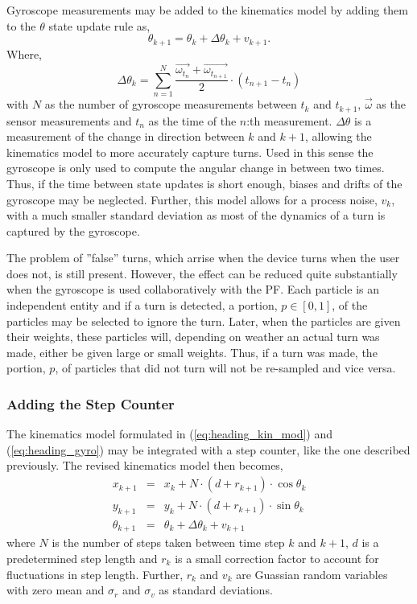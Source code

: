 \documentclass{LTHthesis}
\begin{document}
Gyroscope measurements may be added to the kinematics model by adding them to the $\theta$ state update rule as,
%
\begin{equation}
\theta_{k+1} = \theta_k + \Delta\theta_k + v_{k+1}.\label{eq:heading_gyro}
\end{equation} 
%
Where,
%
\begin{equation}
\Delta\theta_k = \sum^N_{n=1}\frac{\vec{\omega_{t_n}}+\vec{\omega_{t_{n+1}}}}{2}\cdot\left(t_{n+1}-t_n\right)
\end{equation}
%
with $N$ as the number of gyroscope measurements between $t_k$ and $t_{k+1}$, $\vec{\omega}$ as the sensor measurements and $t_n$ as the time of the $n$:th measurement. $\Delta\theta$ is a measurement of the change in direction between $k$ and $k+1$, allowing the kinematics model to more accurately capture turns. Used in this sense the gyroscope is only used to compute the angular change in between two times. Thus, if the time between state updates is short enough, biases and drifts of the gyroscope may be neglected. Further, this model allows for a process noise, $v_k$, with a much smaller standard deviation as most of the dynamics of a turn is captured by the gyroscope. 

The problem of ''false'' turns, which arrise when the device turns when the user does not, is still present. However, the effect can be reduced quite substantially when the gyroscope is used collaboratively with the PF. Each particle is an independent entity and if a turn is detected, a portion, $p\in[0,1]$, of the particles may be selected to ignore the turn. Later, when the particles are given their weights, these particles will, depending on weather an actual turn was made, either be given large or small weights. Thus, if a turn was made, the portion, $p$, of particles that did not turn will not be re-sampled and vice versa. 

\subsubsection{Adding the Step Counter}
%
The kinematics model formulated in (\ref{eq:heading_kin_mod}) and (\ref{eq:heading_gyro}) may be integrated with a step counter, like the one described previously. The revised kinematics model then becomes,
%
\begin{eqnarray}
x_{k+1} &  = & x_k + N\cdot (d + r_{k+1})\cdot\cos{\theta_k} \nonumber\\
y_{k+1} & = &y_k + N\cdot (d + r_{k+1})\cdot\sin{\theta_k}\label{eq:heading_step_kin_mod}\\
\theta_{k+1} & = & \theta_k +\Delta\theta_k+ v_{k+1} \nonumber
\end{eqnarray}  
%
where $N$ is the number of steps taken between time step $k$ and $k+1$, $d$ is a predetermined step length and $ r_k$ is a small correction factor to account for fluctuations in step length. Further, $r_k$ and $v_k$ are Guassian random variables with zero mean and $\sigma_r$ and  $\sigma_v$ as standard deviations.
\end{document}
